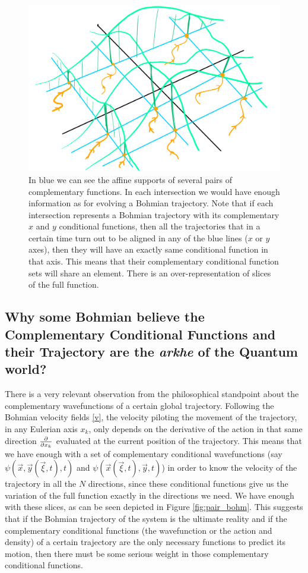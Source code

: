 \documentclass[11pt, a4paper]{article} %
\begin{document}
\begin{figure}[h!]
  \centering
    \includegraphics[width=0.65\linewidth]{many_bohmian.png}
  \caption{In blue we can see the affine supports of several pairs of complementary functions. In each intersection we would have enough information as for evolving a Bohmian trajectory. Note that if each intersection represents a Bohmian trajectory with its complementary $x$ and $y$ conditional functions, then all the trajectories that in a certain time turn out to be aligned in any of the blue lines ($x$ or $y$ axes), then they will have an exactly same conditional function in that axis. This means that their complementary conditional function sets will share an element. There is an over-representation of slices of the full function. }
  \label{fig:over}
\end{figure}
\newpage
\subsection*{Why some Bohmian believe the Complementary Conditional Functions and their Trajectory are the {\em arkhe} of the Quantum world?}
There is a very relevant observation from the philosophical standpoint about the complementary wavefunctions of a certain global trajectory. Following the Bohmian velocity fields \eqref{v}, the velocity piloting the movement of the trajectory, in any Eulerian axis $x_k$, only depends on the derivative of the action in that same direction $\pdv{}{x_k}$ evaluated at the current position of the trajectory. This means that we have enough with a set of complementary conditional wavefunctions (say $\psi(\vec{x},\vec{y}(\vec{\xi},t),t)$ and $\psi(\vec{x}(\vec{\xi},t),\vec{y},t)$) in order to know the velocity of the trajectory in all the $N$ directions, since these conditional functions give us the variation of the full function exactly in the directions we need. We have enough with these slices, as can be seen depicted in Figure \ref{fig:pair_bohm}. This suggests that if the Bohmian trajectory of the system is the ultimate reality and if the complementary conditional functions (the wavefunction or the action and density) of a certain trajectory are the only necessary functions to predict its motion, then there must be some serious weight in those complementary conditional functions. 
\end{document}
